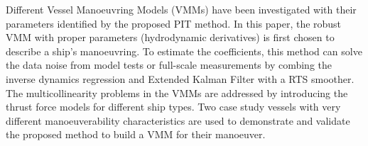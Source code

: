 Different Vessel Manoeuvring Models (VMMs) have been investigated with their parameters identified by the proposed PIT method. In this paper, the robust VMM with proper parameters (hydrodynamic derivatives) is first chosen to describe a ship’s manoeuvring. To estimate the coefficients, this method can solve the data noise from model tests or full-scale measurements by combing the inverse dynamics regression and Extended Kalman Filter with a RTS smoother. The multicollinearity problems in the VMMs are addressed by introducing the thrust force models for different ship types. Two case study vessels with very different manoeuverability characteristics are used to demonstrate and validate the proposed method to build a VMM for their manoeuver.